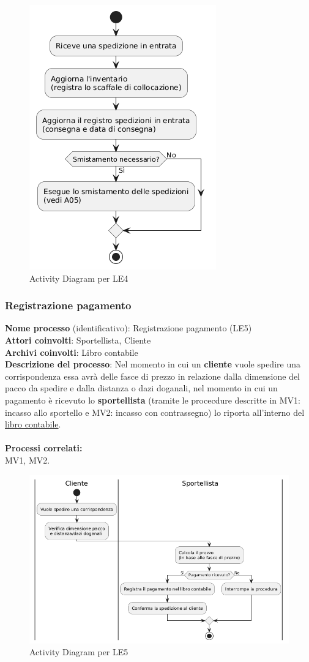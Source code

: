 \documentclass[a4paper,12pt]{article}
\begin{document}
\begin{figure}[H]
	\centering
	\includegraphics[width=0.3\linewidth]{assets/activitydiagram_LE4.png}
	\caption{Activity Diagram per LE4}
\end{figure}

\newpage
\subsubsection{Registrazione pagamento}
\textbf{Nome processo} (identificativo): Registrazione pagamento (LE5) \\
\textbf{Attori coinvolti}: Sportellista, Cliente  \\
\textbf{Archivi coinvolti}: Libro contabile\\
\textbf{Descrizione del processo}: Nel momento in cui un \textbf{cliente} vuole spedire una corrispondenza essa avrà delle fasce di prezzo in relazione 
dalla dimensione del pacco da spedire e dalla distanza o dazi doganali, nel momento in cui un pagamento è ricevuto lo \textbf{sportellista} 
(tramite le procecdure descritte in MV1: incasso allo sportello e MV2: incasso con contrassegno) lo riporta all'interno del \underline{libro contabile}. \\ \\
\textbf{Processi correlati:} \\ MV1, MV2. \\

\begin{figure}[H]
	\centering
	\includegraphics[width=0.8\linewidth]{assets/activitydiagram_LE5.png}
	\caption{Activity Diagram per LE5}
\end{figure}
\end{document}
